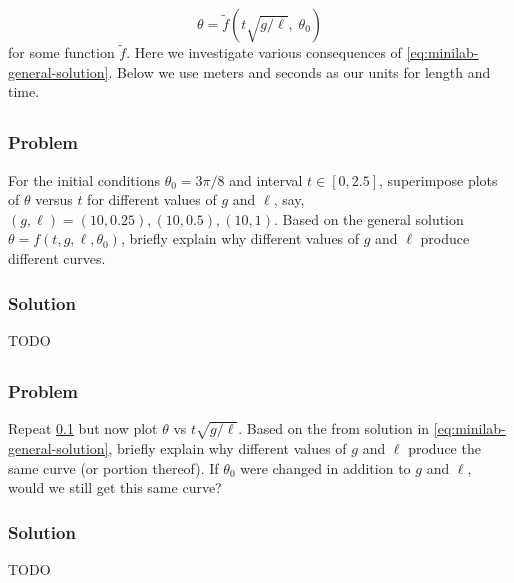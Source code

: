 \documentclass[12pt]{article}
\begin{document}
\begin{equation}
  \label{eq:minilab-general-solution}
  \theta = \tilde{f}(t\sqrt{g/\ell}, \;\theta_0)
\end{equation}
for some function $\tilde{f}$. Here we investigate various consequences of
\cref{eq:minilab-general-solution}. Below we use meters and seconds as our units
for length and time.

\subsection{}
  \label{sec:minilab-part-1}
  \subsubsection*{Problem}
  For the initial conditions $\theta_0=3\pi/8$ and interval $t\in[0,2.5]$,
  superimpose plots of $\theta$ versus $t$ for different values of $g$ and $\ell$,
  say, $(g,\ell)=(10, 0.25), (10, 0.5), (10, 1)$. Based on the general solution
  $\theta = f(t,g,\ell,\theta_0)$, briefly explain why different values of $g$ and
  $\ell$ produce different curves.

  \subsubsection*{Solution}
  {\huge \color{red}TODO}

\subsection{}
  \label{sec:minilab-part-2}
  \subsubsection*{Problem}
  Repeat \cref{sec:minilab-part-1} but now plot $\theta$ vs $t\sqrt{g/\ell}$.
  Based on the from solution in \cref{eq:minilab-general-solution}, briefly
  explain why different values of $g$ and $\ell$ produce the same curve (or
  portion thereof). If $\theta_0$ were changed in addition to $g$ and $\ell$,
  would we still get this same curve?

  \subsubsection*{Solution}
    {\huge \color{red}TODO}

\subsection{}
\end{document}
